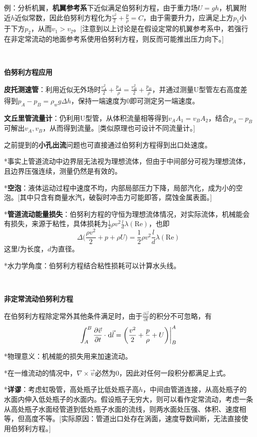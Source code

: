 \documentclass[a4paper,UTF8,fontset=windows]{ctexart}
\newcommand*{\dr}{\hspace{0.07em}\mathrm{d}}
\begin{document}
例：分析机翼，\textbf{机翼参考系}下近似满足伯努利方程，由于重力场$U=gh$，机翼附近$h$近似常数，因此伯努利方程化为$\frac{v^2}{2}+\frac{p}{\rho}=C$，由于需要升力，应满足上方$p_1$小于下方$p_2$，从而$v_1>v_2$。[注意到以上讨论是在假设定常的机翼参考系中，若强行在非定常流动的地面参考系使用伯努利方程，则反而可能推出压力向下。]

\

\textbf{伯努利方程应用}

\textbf{皮托测速管}：利用近似无外场时$\frac{v_A^2}{2}+\frac{p_A}{\rho}=\frac{v_B^2}{2}+\frac{p_B}{\rho}$，并通过测量U型管左右高度差得到$p_A-p_B=\rho_wg\Delta h$，保持一端速度为0即可测定另一端速度。

\textbf{文丘里管流量计}：仍利用U型管，从体积流量相等得到$v_AA_1=v_BA_2$，结合$p_A-p_B$可解出$v_A,v_B$，从而得到流量。[类似原理也可设计不同流量计。]

之前提到的\textbf{小孔出流}问题也可直接通过伯努利方程得到出口处速度。

*事实上管道流动中边界层无法视为理想流体，但由于中间部分可视为理想流体，且边界压强连续，测量仍然是有效的。

*\textbf{空泡}：液体运动过程中速度不均，内部局部压力下降，局部汽化，成为小的空泡。[其中只含有商量水汽，破裂时冲击力可能即答，腐蚀金属表面。]

*\textbf{管道流动能量损失}：伯努利方程的守恒为理想流体情况，对实际流体，机械能会有损失，来源于粘性，具体损耗为$\frac{1}{2}\rho v^2\frac{l}{d}\lambda(\mathrm{Re})$，也即
$$\Delta\bigg(\frac{\rho v^2}{2}+p+\rho U\bigg)=\frac{1}{2}\rho v^2\frac{l}{d}\lambda(\mathrm{Re})$$
这里$l$为长度，$d$为直径。

*水力学角度：伯努利方程结合粘性损耗可以计算水头线。

\

\textbf{非定常流动伯努利方程}

在伯努利方程除定常外其他条件满足时，由于$\frac{\partial \vec{v}}{\partial t}$的积分不可忽略，有
$$\int_A^B\frac{\partial\vec{v}}{\partial t}\cdot\dr\vec{l}=\bigg(\frac{v^2}{2}+\frac{p}{\rho}+U\bigg)\bigg|_B^A$$

*物理意义：机械能的损失用来加速流动。

*在一维流动的情况中，$\nabla\times\vec{v}$必然为0，因此对任何一段积分都满足上式。

*\textbf{详谬}：考虑虹吸管，高处瓶子比低处瓶子高$h$，中间由管道连接，从高处瓶子的水面内伸入低处瓶子的水面内。假设瓶子无穷大，则可以看作定常流动，考虑一条从高处瓶子水面经管道到低处瓶子水面的流线，则两水面处压强、体积、速度相等，但高度不等。[实际原因：管道出口处存在涡面，速度导数间断，无法直接使用伯努利方程。]
\end{document}
